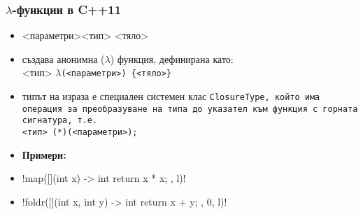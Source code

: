 \documentclass[alsotrans,beameroptions={aspectratio=169}]{beamerswitch}
\begin{document}
\begin{frame}[fragile]
  \frametitle{$\lambda$-функции в C++11}
  \begin{itemize}[<+->]
  \item \tta{[](}<параметри>\tta{) -> }<тип> \tta{\{}<тяло>\tta{\}}
  \item създава анонимна ($\lambda$) функция, дефинирана като:\\
    <тип> $\lambda$\tt(<параметри>\tt{) \{}<тяло>\tt\}
  \item типът на израза е специален системен клас \tt{ClosureType}, който има операция за преобразуване на типа до указател към функция с горната сигнатура, т.е.\\
    <тип> \tt{(*)(}<параметри>\tt{);}
  \item \textbf{Примери:}
  \item \lst!map([](int x) -> int { return x * x; }, l)!
  \item \lst!foldr([](int x, int y) -> int { return x + y; }, 0, l)!
  \end{itemize}
\end{frame}

\end{document}
